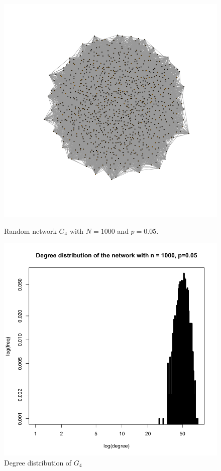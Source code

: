 \documentclass[draftcls,12pt,onecolumn]{IEEEtran}
\begin{document}
\begin{figure}[H]
\centering
\begin{minipage}[t]{0.48\textwidth}
\centering
\includegraphics[scale=0.2]{figures_part1_1/output_6_0.png}
\caption{Random network $G_4$ with $N=1000$ and $p=0.05$.}
\label{fig1}
\end{minipage}
\begin{minipage}[t]{0.48\textwidth}
\centering
\includegraphics[scale=0.2]{figures_part1_1/output_11_1.png}
\caption{Degree distribution of $G_4$}
\label{fig2}
\end{minipage}
\end{figure}
\end{document}
